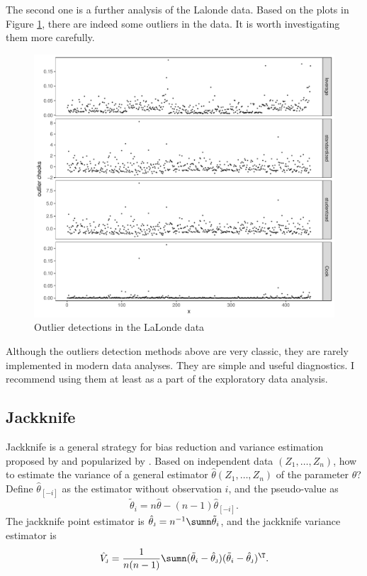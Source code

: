 The second one is a further analysis of the Lalonde data. Based on the plots in Figure \ref{fig::outlier-detections-lalonde}, there are indeed some outliers in the data. It is worth investigating them more carefully. 

\begin{figure}[ht]
\centering
\includegraphics[width = \textwidth]{figures/residual_diagnostics_lalonde.pdf}
\caption{Outlier detections in the LaLonde data}\label{fig::outlier-detections-lalonde}
\end{figure}



Although the outliers detection methods above are very classic, they are rarely implemented in modern data analyses. They are simple and useful diagnostics. I recommend using them at least as a part of the exploratory data analysis.  

 
 
\subsection{Jackknife} 
 

Jackknife is a general strategy for bias reduction and variance estimation proposed by \citet{quenouille1949approximate, quenouille1956notes} and popularized by  \citet{tukey1958bias}. Based on independent data $(Z_1,\ldots,Z_n)$, how to estimate the variance of a general estimator $\hat{\theta}(Z_1,\ldots,Z_n)$ of the parameter $\theta$? Define $\hat{\theta}_{[-i]}$ as the estimator without observation $i$, and the pseudo-value as 
$$
\tilde{\theta}_i = n \hat{\theta} - (n-1) \hat{\theta}_{[-i]} .
$$ 
The jackknife point estimator is $\hat{\theta}_\textsc{j} = n^{-1} \sumn \tilde{\theta}_i$, and the jackknife variance estimator is 
 $$
\hat{V}_\textsc{j}  = \frac{1}{n(n-1)}\sumn (\tilde{\theta}_i  - \hat{\theta}_\textsc{j}  )(\tilde{\theta}_i - \hat{\theta}_\textsc{j}  )^{\T}.
 $$


